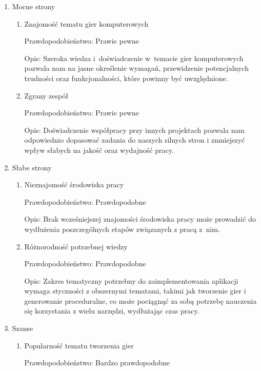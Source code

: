 \begin{enumerate}
    \item Mocne strony
        \begin{enumerate}
            \item Znajomość tematu gier komputerowych 
            
            Prawdopodobieństwo: Prawie pewne
            
            Opis: Szeroka wiedza i~doświadczenie w~temacie gier komputerowych pozwala nam na jasne określenie wymagań, przewidzenie potencjalnych trudności oraz funkcjonalności, które powinny być uwzględnione.
            \item Zgrany zespół 
            
            Prawdopodobieństwo: Prawie pewne
            
            Opis: Doświadczenie współpracy przy innych projektach pozwala nam odpowiednio dopasować zadania do naszych silnych stron i zmniejszyć wpływ słabych na jakość oraz wydajność pracy.
        \end{enumerate}
        
    \item Słabe strony
        \begin{enumerate}
            \item Nieznajomość środowiska pracy
            
            Prawdopodobieństwo: Prawdopodobne
            
            Opis:  Brak wcześniejszej znajomości środowiska pracy może prowadzić do wydłużenia poszczególnych etapów związanych z pracą z~nim.
            \item Różnorodność potrzebnej wiedzy 
            
            Prawdopodobieństwo: Prawdopodobne
            
            Opis:  Zakres tematyczny potrzebny do zaimplementowania aplikacji wymaga styczności z obszernymi tematami, takimi jak tworzenie gier i generowanie proceduralne, co może pociągnąć za sobą potrzebę nauczenia się korzystania z wielu narzędzi, wydłużając czas pracy.
        \end{enumerate}
        
    \item Szanse
        \begin{enumerate}
            \item Popularność tematu tworzenia gier
            
            Prawdopodobieństwo: Bardzo prawdopodobne
            

\end{enumerate}
\end{enumerate}
